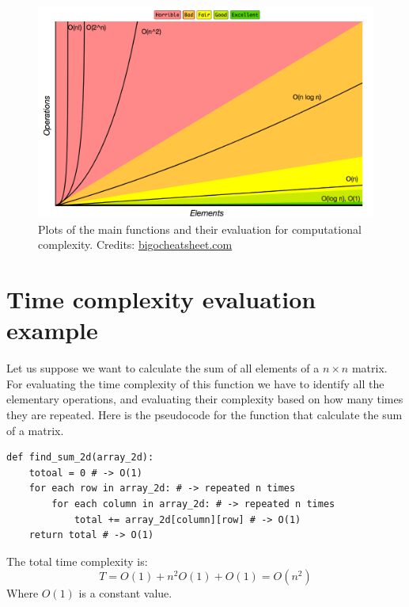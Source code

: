 \begin{figure}[hb]
	\begin{center}
		\includegraphics[scale=.3]{chapters/introduction/images/big_o_plots.png}
		\caption[Plots of the main functions and their evaluation for computational complexity]{Plots of the main functions and their evaluation for computational complexity. Credits: \href{https://www.bigocheatsheet.com/}{bigocheatsheet.com}}
		\label{fig:bigoplots}
	\end{center}
\end{figure}

\section{Time complexity evaluation example}
Let us suppose we want to calculate the sum of all elements of a \(n\times n\) matrix. For evaluating the time complexity of this function we have to identify all the elementary operations, and evaluating their complexity based on how many times they are repeated. Here is the pseudocode for the function that calculate the sum of a matrix.

\begin{lstlisting}[firstnumber=1, caption={Sum of all elements of a matrix.}]
def find_sum_2d(array_2d):
	totoal = 0 # -> O(1)
	for each row in array_2d: # -> repeated n times
		for each column in array_2d: # -> repeated n times
			total += array_2d[column][row] # -> O(1)
	return total # -> O(1)
\end{lstlisting}

The total time complexity is: 
\[T = O(1) + n^{2}O(1) + O(1) = O(n^{2}) \]
Where \(O(1)\) is a constant value.

